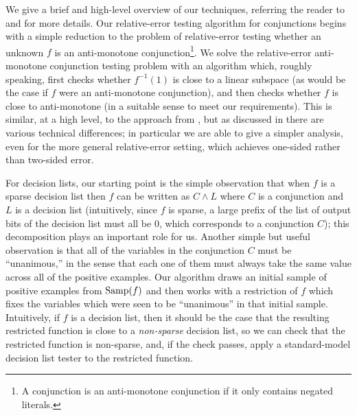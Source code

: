 \documentclass[11pt]{article}
\theoremstyle{definition}
\begin{document}
{
We give a brief and high-level overview of our techniques, referring the reader to  and  for more details. Our relative-error testing algorithm for conjunctions begins with a simple reduction to the problem of relative-error testing whether an unknown $f$ is an anti-monotone conjunction\footnote{A conjunction is an anti-monotone conjunction if it only contains negated literals.}.  We solve the relative-error anti-monotone conjunction testing problem with an algorithm which, roughly speaking, first checks whether $f^{-1}(1)$ is close to a linear subspace (as would be the case if $f$ were an anti-monotone conjunction), and then checks whether $f$ is close to anti-monotone (in a suitable sense to meet our requirements).  This is similar, at a high level, to the approach from \cite{PRS02}, but as discussed in  there are various technical differences; in particular we are able to give a simpler analysis, even for the more general relative-error setting, which achieves one-sided rather than two-sided error.

For decision lists, our starting point is the simple observation that when $f$ is a sparse decision list then $f$ can be written as $C \wedge L$ where $C$ is a conjunction and $L$ is a decision list (intuitively, since $f$ is sparse, a large prefix of the list of output bits of the decision list must all be 0, which corresponds to a conjunction $C$); this decomposition plays an important role for us.  Another simple but useful observation is that all of the variables in the conjunction $C$ must be ``unanimous,'' in the sense that each one of them must always take the same value across all of the positive examples.  Our algorithm draws an initial sample of positive examples from $\mathrm{Samp}(f)$ and then works with a restriction of $f$ which fixes the variables which were seen to be ``unanimous'' in that initial sample.  Intuitively, if $f$ is a decision list, then it should be the case that the resulting restricted function is close to a \emph{non-sparse} decision list, so we can check that the restricted function is non-sparse, and, if the check passes, apply a standard-model decision list tester to the restricted function.  

}
\end{document}
